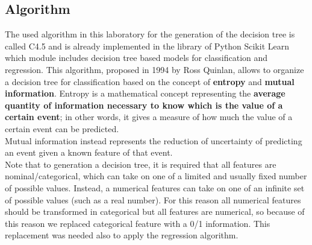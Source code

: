 \documentclass[a4paper,12pt,oneside,titlepage]{article}
\begin{document}
	\subsection{Algorithm}
	The used algorithm in this laboratory for the generation of the decision tree is called C4.5 and is already implemented in the library of Python Scikit Learn which module includes decision tree based models for classification and regression. This algorithm, proposed in 1994 by Ross Quinlan, allows to organize a decision tree for classification based on the concept of \textbf{entropy} and \textbf{mutual information}. Entropy is a mathematical concept representing the \textbf{average quantity of information necessary to know which is the value of a certain event}; in other words, it gives a measure of how much the value of a certain event can be predicted.\\
	Mutual information instead represents the reduction of uncertainty of predicting an event given a known feature of that event.\\
	Note that to generation a decision tree, it is required that all features are nominal/categorical, which can take on one of a limited and usually fixed number of possible values. Instead, a numerical features can take on one of an infinite set of possible values (such as a real number). For this reason all numerical features should be transformed in categorical but all features are numerical, so because of this reason we replaced categorical feature with a 0/1 information. This replacement was needed also to apply the regression algorithm.
	
	
\end{document}
